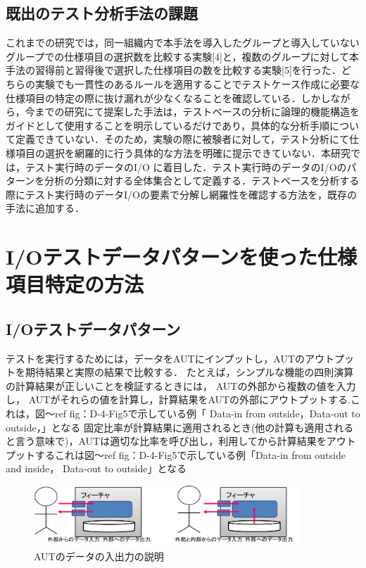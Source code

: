 \documentclass[a4paper,11pt]{jreport}
\begin{document}
\subsection{既出のテスト分析手法の課題}
これまでの研究では，同一組織内で本手法を導入したグループと導入していないグループでの仕様項目の選択数を比較する実験[4]と，複数のグループに対して本手法の習得前と習得後で選択した仕様項目の数を比較する実験[5]を行った．どちらの実験でも一貫性のあるルールを適用することでテストケース作成に必要な仕様項目の特定の際に抜け漏れが少なくなることを確認している．しかしながら，今までの研究にて提案した手法は，テストベースの分析に論理的機能構造をガイドとして使用することを明示しているだけであり，具体的な分析手順について定義できていない．そのため，実験の際に被験者に対して，テスト分析にて仕様項目の選択を網羅的に行う具体的な方法を明確に提示できていない．本研究では，テスト実行時のデータのI/O に着目した．テスト実行時のデータのI/Oのパターンを分析の分類に対する全体集合として定義する．テストベースを分析する際にテスト実行時のデータI/Oの要素で分解し網羅性を確認する方法を，既存の手法に追加する．

\section{I/Oテストデータパターンを使った仕様項目特定の方法}

\subsection{I/Oテストデータパターン}

テストを実行するためには，データをAUTにインプットし，AUTのアウトプットを期待結果と実際の結果で比較する．
たとえば，シンプルな機能の四則演算の計算結果が正しいことを検証するときには， AUTの外部から複数の値を入力し， AUTがそれらの値を計算し，計算結果をAUTの外部にアウトプットする.これは，図〜ref {fig：D-4-Fig5}で示している例「 Data-in from outside，Data-out to outside，」となる
固定比率が計算結果に適用されるとき(他の計算も適用されると言う意味で)，AUTは適切な比率を呼び出し，利用してから計算結果をアウトプットするこれは図〜ref {fig：D-4-Fig5}で示している例「Data-in from outside and inside， Data-out to outside」となる
 \begin{figure}[htbp]
  \begin{center}
  \includegraphics[width=10cm]{./image/D-3-Fig4.png}
  \caption{AUTのデータの入出力の説明}
  \label{fig:D-4-Fig5}
  \end{center}
   \end{figure}
\end{document}
